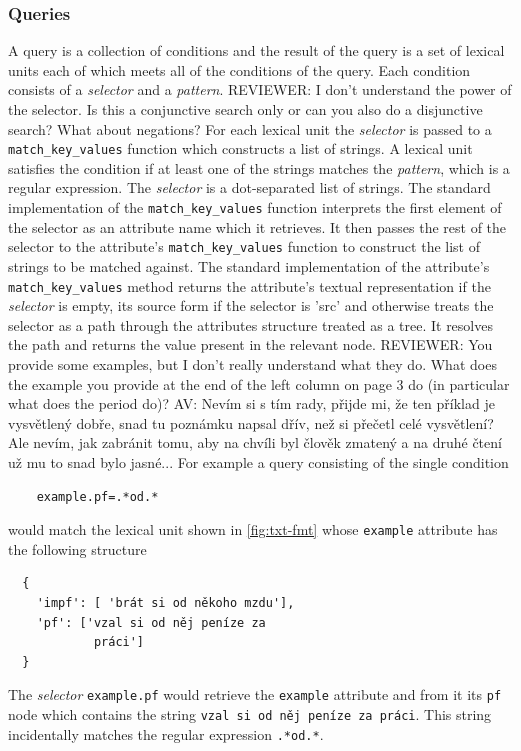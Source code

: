 \documentclass[10pt, a4paper]{article}
\newcommand{\py}[1]{{\tt #1}}
\newcommand{\att}[1]{{\tt #1}}
\newcommand{\av}[1]{{\color{ansa} AV: #1}}
\newcommand{\rrr}[1]{{\color{red} REVIEWER: #1}}
\begin{document}
\subsubsection{Queries}\label{sec:query}
A query is a collection of conditions
and the result of the query is a set of lexical units each of which meets all
of the conditions of the query. Each condition consists of a \emph{selector} and a
\emph{pattern}. 
\rrr{I don't understand the power of the selector. Is this a conjunctive search only or can you also do a disjunctive search? What about negations?}
For each lexical unit the \emph{selector} is passed to a \py{match\_key\_values}
function which constructs a list of strings. A lexical unit satisfies the condition if at
least one of the strings matches the \emph{pattern}, which is a regular expression.
The \emph{selector} is a dot-separated list of strings. The standard implementation of the
\py{match\_key\_values} function interprets the first element of the selector as an attribute
name which it retrieves. It then passes the rest of the selector to the attribute's \py{match\_key\_values}
function to construct the list of strings to be matched against. The standard implementation
of the attribute's \py{match\_key\_values} method returns the attribute's textual representation
if the \emph{selector} is empty, its source form if the selector is 'src' and otherwise treats
the selector as a path through the attributes structure treated as a tree. It resolves the path and returns the
value present in the relevant node. 
\rrr{You provide some examples, but I don't really understand what they do. What does the example you provide at the end of the left column on page 3 do (in particular what does the period do)?}
\av{Nevím si s tím rady, přijde mi, že ten příklad je vysvětlený dobře, snad tu poznámku napsal dřív, než si přečetl celé vysvětlení? Ale nevím, jak zabránit tomu, aby na chvíli byl člověk zmatený a na druhé čtení už mu to snad bylo jasné...}
For example a query consisting of the single condition
\begin{verbatim}
    example.pf=.*od.*
\end{verbatim}
would match the lexical unit shown in \autoref{fig:txt-fmt} whose \att{example} attribute
has the following structure
\begin{verbatim}
  {
    'impf': [ 'brát si od někoho mzdu'],
    'pf': ['vzal si od něj peníze za
            práci']
  }
\end{verbatim}
The \emph{selector} \att{example.pf} would retrieve the \att{example} attribute and from it
its \att{pf} node which contains the string {\tt vzal si od něj peníze za práci}. This string
incidentally matches the regular expression {\tt .*od.*}.
\end{document}
